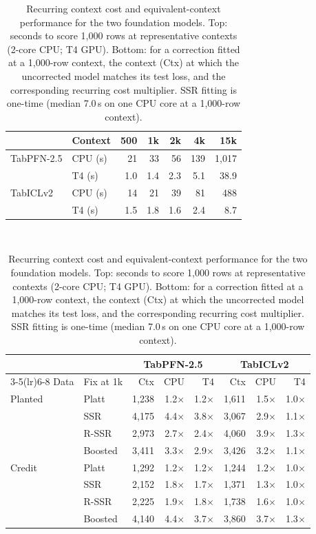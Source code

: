 \begin{table}[t]
\centering
\caption{Recurring context cost and equivalent-context performance for the two foundation models. Top: seconds to score 1{,}000 rows at representative contexts (2-core CPU; T4 GPU). Bottom: for a correction fitted at a 1{,}000-row context, the context (Ctx) at which the uncorrected model matches its test loss, and the corresponding recurring cost multiplier. SSR fitting is one-time (median 7.0\,s on one CPU core at a 1{,}000-row context).}
\label{tab:cost}
\footnotesize\setlength{\tabcolsep}{3.5pt}
\begin{tabular}{llrrrrr}
\toprule
 & Context & 500 & 1k & 2k & 4k & 15k \\
\midrule
TabPFN-2.5 & CPU (s) & 21 & 33 & 56 & 139 & 1{,}017 \\
 & T4 (s) & 1.0 & 1.4 & 2.3 & 5.1 & 38.9 \\
TabICLv2 & CPU (s) & 14 & 21 & 39 & 81 & 488 \\
 & T4 (s) & 1.5 & 1.8 & 1.6 & 2.4 & 8.7 \\
\bottomrule
\end{tabular}
\\[4pt]
\begin{tabular}{llrrrrrr}
\toprule
 & & \multicolumn{3}{c}{TabPFN-2.5} & \multicolumn{3}{c}{TabICLv2} \\
\cmidrule(lr){3-5}\cmidrule(lr){6-8}
Data & Fix at 1k & Ctx & CPU & T4 & Ctx & CPU & T4 \\
\midrule
Planted & Platt & 1,238 & 1.2$\times$ & 1.2$\times$ & 1,611 & 1.5$\times$ & 1.0$\times$ \\
 & SSR & 4,175 & 4.4$\times$ & 3.8$\times$ & 3,067 & 2.9$\times$ & 1.1$\times$ \\
 & R-SSR & 2,973 & 2.7$\times$ & 2.4$\times$ & 4,060 & 3.9$\times$ & 1.3$\times$ \\
 & Boosted & 3,411 & 3.3$\times$ & 2.9$\times$ & 3,426 & 3.2$\times$ & 1.1$\times$ \\
\midrule
Credit & Platt & 1,292 & 1.2$\times$ & 1.2$\times$ & 1,244 & 1.2$\times$ & 1.0$\times$ \\
 & SSR & 2,152 & 1.8$\times$ & 1.7$\times$ & 1,371 & 1.3$\times$ & 1.0$\times$ \\
 & R-SSR & 2,225 & 1.9$\times$ & 1.8$\times$ & 1,738 & 1.6$\times$ & 1.0$\times$ \\
 & Boosted & 4,140 & 4.4$\times$ & 3.7$\times$ & 3,860 & 3.7$\times$ & 1.3$\times$ \\
\bottomrule
\end{tabular}
\end{table}
